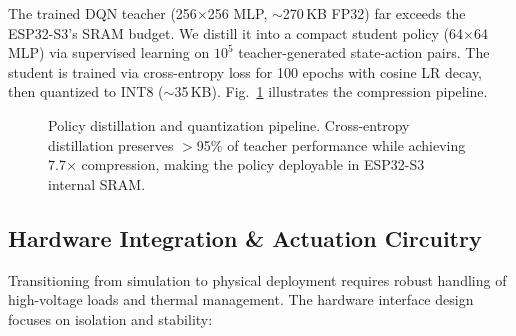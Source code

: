 \documentclass[conference]{IEEEtran}
\begin{document}
    The trained DQN teacher (256$\times$256 MLP, $\sim$270\,KB FP32) far exceeds the ESP32-S3's SRAM budget. We distill it into a compact student policy (64$\times$64 MLP) via supervised learning on $10^5$ teacher-generated state-action pairs. The student is trained via cross-entropy loss for 100 epochs with cosine LR decay, then quantized to INT8 ($\sim$35\,KB). Fig.~\ref{fig:distillation} illustrates the compression pipeline.

    \begin{figure}[!t]
    \centering
    \caption{Policy distillation and quantization pipeline. Cross-entropy distillation preserves $>$95\% of teacher performance while achieving 7.7$\times$ compression, making the policy deployable in ESP32-S3 internal SRAM.}
    \label{fig:distillation}
    \end{figure}

    \subsection{Hardware Integration \& Actuation Circuitry}

    Transitioning from simulation to physical deployment requires robust handling of high-voltage loads and thermal management. The hardware interface design focuses on isolation and stability:
\end{document}
